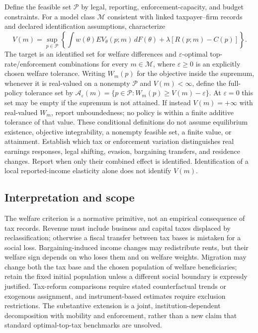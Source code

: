 \documentclass[11pt,a4paper]{article}
\begin{document}
Define the feasible set $\mathcal P$ by legal, reporting, enforcement-capacity, and budget constraints. For a model class $\mathcal M$ consistent with linked taxpayer--firm records and declared identification assumptions, characterize
\[
 V(m)=\sup_{p\in\mathcal P}\left\{\int w(\theta)EV_\theta(p;m)\,dF(\theta)+\lambda[R(p;m)-C(p)]\right\}.
\]
The target is an identified set for welfare differences and $\varepsilon$-optimal top-rate/enforcement combinations for every $m\in\mathcal M$, where $\varepsilon\geq0$ is an explicitly chosen welfare tolerance. Writing $W_m(p)$ for the objective inside the supremum, whenever it is real-valued on a nonempty $\mathcal P$ and $V(m)<\infty$, define the full-policy tolerance set by $\mathcal A_\varepsilon(m)=\{p\in\mathcal P:W_m(p)\geq V(m)-\varepsilon\}$. At $\varepsilon=0$ this set may be empty if the supremum is not attained. If instead $V(m)=+\infty$ with real-valued $W_m$, report unboundedness; no policy is within a finite additive tolerance of that value. These conditional definitions do not assume equilibrium existence, objective integrability, a nonempty feasible set, a finite value, or attainment. Establish which tax or enforcement variation distinguishes real earnings responses, legal shifting, evasion, bargaining transfers, and residence changes. Report when only their combined effect is identified. Identification of a local reported-income elasticity alone does not identify $V(m)$.

\subsection*{Interpretation and scope}
The welfare criterion is a normative primitive, not an empirical consequence of tax records. Revenue must include business and capital taxes displaced by reclassification; otherwise a fiscal transfer between tax bases is mistaken for a social loss. Bargaining-induced income changes may redistribute rents, but their welfare sign depends on who loses them and on welfare weights. Migration may change both the tax base and the chosen population of welfare beneficiaries; retain the fixed initial population unless a different social boundary is expressly justified. Tax-reform comparisons require stated counterfactual trends or exogenous assignment, and instrument-based estimates require exclusion restrictions. The substantive extension is a joint, institution-dependent decomposition with mobility and enforcement, rather than a new claim that standard optimal-top-tax benchmarks are unsolved.
\end{document}
